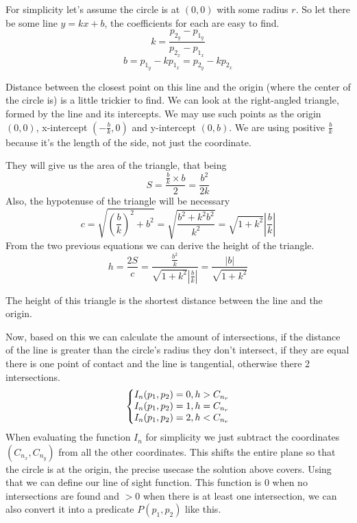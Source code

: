 \documentclass[12pt, titlepage]{article}
\begin{document}
For simplicity let's assume the circle is at $(0, 0)$ with
some radius $r$.
So let there be some line $y = kx + b$, the coefficients for each are easy to find.
\begin{equation}
    k = \frac{p_{2_y}-p_{1_y}}{p_{2_x}-p_{1_x}}
\end{equation}
\begin{equation}
    b = p_{1_y} - k p_{1_x} = p_{2_y} - k p_{2_x} 
\end{equation}

Distance between the closest point on this line and the origin (where the center
of the circle is) is a little trickier to find. We can look at the right-angled triangle, formed
by the line and its intercepts. We may use such points as the origin $(0, 0)$, 
x-intercept $(-\frac{b}{k}, 0)$ and y-intercept $(0, b)$. We are using positive
$\frac{b}{k}$ because it's the length of the side, not just the coordinate.

They will give us the area of the triangle, that being
\begin{equation}
    S = \frac{\frac{b}{k} \times b}{2}  = \frac{b^2}{2k}
\end{equation}
Also, the hypotenuse of the triangle will be necessary
\begin{equation}
    c = \sqrt{\left(\frac{b}{k}\right)^2 + b^2} = \sqrt{\frac{b^2 + k^2b^2}{k^2}} = \sqrt{1+k^2}\left|\frac{b}{k}\right|
\end{equation}
From the two previous equations we can derive the height of the triangle.
\begin{equation}
    h = \frac{2S}{c} = \frac{\frac{b^2}{k}}{\sqrt{1+k^2}\left|\frac{b}{k}\right|} = \frac{|b|}{\sqrt{1 + k^2}}
\end{equation}

The height of this triangle is the shortest distance between the line and the 
origin.

Now, based on this we can calculate the amount of intersections, if the distance
of the line is greater than the circle's radius they don't intersect,
if they are equal there is one point of contact and the line is tangential,
otherwise there 2 intersections.
\begin{equation}
    \left\{\begin{array}{@{}l@{}}
       I_n(p_1, p_2) = 0, h > C_{n_r}\\
       I_n(p_1, p_2) = 1, h = C_{n_r}\\
       I_n(p_1, p_2) = 2, h < C_{n_r}
    \end{array}\right.
\end{equation}
When evaluating the function $I_n$ for simplicity we just subtract the 
coordinates $(C_{n_x}, C_{n_y})$ from all the other coordinates. This shifts 
the entire plane so that the circle is at the origin, the precise usecase the
solution above covers. Using that we can define our line of sight function.
This function is 0 when no intersections are found and $> 0$ when there is
at least one intersection, we can also convert it into a predicate $P(p_1, p_2)$ like this.
\end{document}
